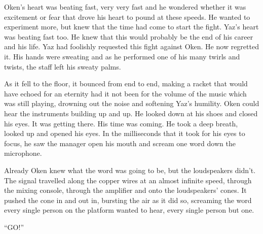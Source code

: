 Oken's heart was beating fast, very very fast and he wondered whether it was excitement or fear that drove his heart to pound at these speeds.  He wanted to experiment more, but knew that the time had come to start the fight.  Yaz's heart was beating fast too.  He knew that this would probably be the end of his career and his life.  Yaz had foolishly requested this fight against Oken.  He now regretted it.  His hands were sweating and as he performed one of his many twirls and twists, the staff left his sweaty palms.  

As it fell to the floor, it bounced from end to end, making a racket that would have echoed for an eternity had it not been for the volume of the music which was still playing, drowning out the noise and softening Yaz's humility.  Oken could hear the instruments building up and up.  He looked down at his shoes and closed his eyes.  It was getting there.  His time was coming.  He took a deep breath, looked up and opened his eyes.  In the milliseconds that it took for his eyes to focus, he saw the manager open his mouth and scream one word down the microphone.  

Already Oken knew what the word was going to be, but the loudspeakers didn't.  The signal travelled along the copper wires at an almost infinite speed, through the mixing console, through the amplifier and onto the loudspeakers' cones.  It pushed the cone in and out in, bursting the air as it did so, screaming the word every single person on the platform wanted to hear, every single person but one.

``GO!''



